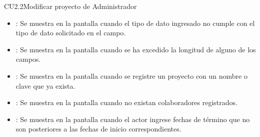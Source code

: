 \begin{UseCase}{CU2.2}{Modificar proyecto de Administrador}
{\begin{itemize}
		\item {}: Se muestra en la pantalla  cuando el tipo de dato ingresado no cumple con el tipo de dato solicitado en
		el campo.
		\item {}: Se muestra en la pantalla  cuando se ha excedido la longitud de alguno de los campos.
		\item {}: Se muestra en la pantalla  cuando se registre un proyecto con un nombre o clave que ya exista.
		\item {}: Se muestra en la pantalla  cuando no existan colaboradores registrados.
		\item {}: Se muestra en la pantalla  cuando el actor ingrese fechas de término que no son posteriores a las fechas
		de inicio correspondientes.
		\end{itemize}
		}
	\end{UseCase}
